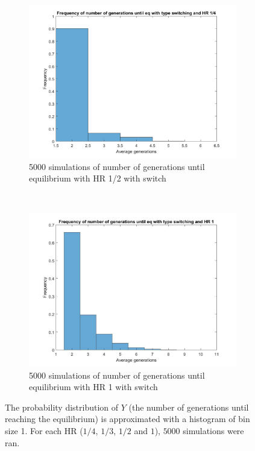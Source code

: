 \begin{figure}[H]
\begin{subfigure}{0.45\textwidth}
        \includegraphics[width=\textwidth]{AantGen3.pdf}
        \caption{5000 simulations of number of generations until equilibrium with HR 1/2 with switch}
        \label{hists hap 1/2}
    \end{subfigure}
    ~
    \begin{subfigure}{0.45\textwidth}
        \includegraphics[width=\textwidth]{AantGen4.pdf}
        \caption{5000 simulations of number of generations until equilibrium with HR 1 with switch}
        \label{hists hap 1}
    \end{subfigure}
    \caption{The probability distribution of $Y$ (the number of generations until reaching the equilibrium) is approximated with a histogram of bin size 1. 
    For each HR ($1/4$, $1/3$, $1/2$ and $1$), $5000$ simulations were ran.}
    \label{fig:histogramSw}
\end{figure}
